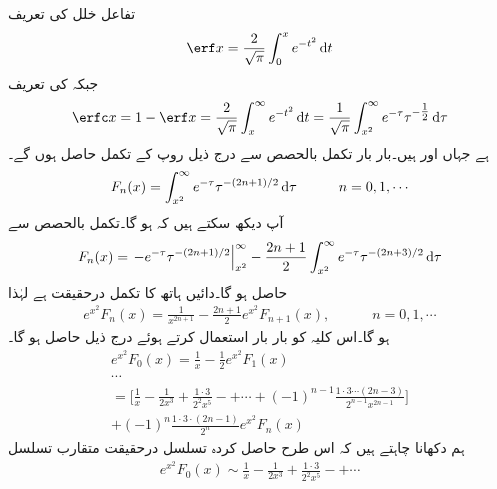 \quad {}\quad
تفاعل خلل  کی تعریف
\begin{align}\label{مساوات_اعدادی_متقارب_خلل_الف}
\erf x=\frac{2}{\sqrt{\pi}}\int_0^x e^{-t^2}\dif t
\end{align}
جبکہ  کی تعریف
\begin{align}\label{مساوات_اعدادی_متقارب_خلل_ب}
\erfc x=1-\erf x=\frac{2}{\sqrt{\pi}}\int_{x}^{\infty} e^{-t^2}\dif t=\frac{1}{\sqrt{\pi}} \int_{x^2}^{\infty} e^{-\tau} \tau^{-\tfrac{1}{2}}\dif \tau
\end{align}
ہے جہاں  اور  ہیں۔بار بار تکمل بالحصص سے درج ذیل روپ کے تکمل حاصل ہوں گے۔
\begin{align}\label{مساوات_اعدادی_متقارب_خلل_پ}
F_n(x)=\int_{x^2}^{\infty} e^{-\tau} \tau^{-(2n+1)/2}\dif \tau\quad \quad \quad n=0,1,\cdots
\end{align}
آپ دیکھ سکتے ہیں کہ  ہو گا۔تکمل بالحصص سے
\begin{align*}
F_n(x)=\left. -e^{-\tau}\tau^{-(2n+1)/2}\right|_{x^2}^{\infty}-\frac{2n+1}{2}\int_{x^2}^{\infty}e^{-\tau}\tau^{-(2n+3)/2}\dif \tau
\end{align*}
حاصل ہو گا۔دائیں ہاتھ کا  تکمل درحقیقت  ہے لہٰذا
\begin{align*}
e^{x^2}F_n(x)=\frac{1}{x^{2n+1}}-\frac{2n+1}{2}e^{x^2}F_{n+1}(x),\quad \quad \quad n=0,1,\cdots
\end{align*}
ہو گا۔اس کلیہ کو بار بار استعمال کرتے ہوئے درج ذیل حاصل ہو گا۔
\begin{equation}
\begin{multlined}\label{مساوات_اعدادی_متقارب_خلل_ت}
e^{x^2}F_0(x)=\frac{1}{x}-\frac{1}{2}e^{x^2}F_1(x)\\
\cdots\\
=\big[\frac{1}{x}-\frac{1}{2x^3}+\frac{1\cdot 3}{2^2x^5}-+\cdots+(-1)^{n-1}\frac{1\cdot 3\cdots(2n-3)}{2^{n-1}x^{2n-1}}\big]\\
+(-1)^n\frac{1\cdot 3\cdot (2n-1)}{2^n}e^{x^2}F_n(x)
\end{multlined}
\end{equation}
ہم دکھانا چاہتے ہیں کہ اس طرح حاصل کردہ تسلسل درحقیقت متقارب تسلسل 
\begin{align}\label{مساوات_اعدادی_متقارب_خلل_ٹ}
e^{x^2}F_0(x)\sim \frac{1}{x}-\frac{1}{2x^3}+\frac{1\cdot 3}{2^2x^5}-+\cdots
\end{align}
